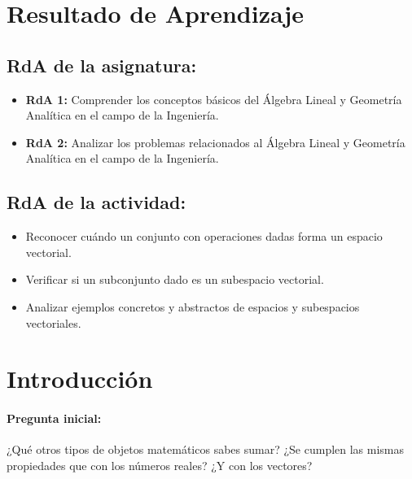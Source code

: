 \documentclass[a4,11pt]{aleph-notas}
\begin{document}
\encabezado


\section*{Resultado de Aprendizaje}

\subsection*{RdA de la asignatura:}
\begin{itemize}[leftmargin=*]
    \item \textbf{RdA 1:} Comprender los conceptos básicos del Álgebra Lineal y Geometría Analítica en el campo de la Ingeniería.
    \item \textbf{RdA 2:} Analizar los problemas relacionados al Álgebra Lineal y Geometría Analítica en el campo de la Ingeniería.
\end{itemize}



\subsection*{RdA de la actividad:}
\begin{itemize}[leftmargin=*]
\item Reconocer cuándo un conjunto con operaciones dadas forma un espacio vectorial.
\item Verificar si un subconjunto dado es un subespacio vectorial.
\item Analizar ejemplos concretos y abstractos de espacios y subespacios vectoriales.
\end{itemize}

\section*{Introducción}

\paragraph{Pregunta inicial:}
¿Qué otros tipos de objetos matemáticos sabes sumar? ¿Se cumplen las mismas propiedades que con los números reales? ¿Y con los vectores?
\end{document}

